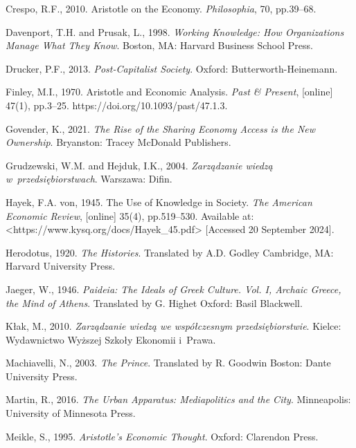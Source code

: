 Crespo, R.F., 2010. Aristotle on the Economy. \textit{Philosophia}, 70, pp.39–68.



Davenport, T.H. and Prusak, L., 1998. \textit{Working Knowledge: How Organizations Manage What They Know}. Boston, MA: Harvard Business School Press.



Drucker, P.F., 2013. \textit{Post-Capitalist Society}. Oxford: Butterworth-Heinemann.



Finley, M.I., 1970. Aristotle and Economic Analysis. \textit{Past \& Present}, [online] 47(1), pp.3–25. https://doi.org/10.1093/past/47.1.3.



Govender, K., 2021. \textit{The Rise of the Sharing Economy Access is the New Ownership}. Bryanston: Tracey McDonald Publishers.



Grudzewski, W.M. and Hejduk, I.K., 2004. \textit{Zarządzanie wiedzą w~przedsiębiorstwach}. Warszawa: Difin.



Hayek, F.A. von, 1945. The Use of Knowledge in Society. \textit{The American Economic Review}, [online] 35(4), pp.519–530. Available at: {\textless}https://www.kysq.org/docs/Hayek\_45.pdf{\textgreater} [Accessed 20 September 2024].



Herodotus, 1920. \textit{The Histories}. Translated by A.D. Godley Cambridge, MA: Harvard University Press.



Jaeger, W., 1946. \textit{Paideia: The Ideals of Greek Culture. Vol. I, Archaic Greece, the Mind of Athens}. Translated by G. Highet Oxford: Basil Blackwell.



Kłak, M., 2010. \textit{Zarządzanie wiedzą we współczesnym przedsiębiorstwie}. Kielce: Wydawnictwo Wyższej Szkoły Ekonomii i~Prawa.



Machiavelli, N., 2003. \textit{The Prince}. Translated by R. Goodwin Boston: Dante University Press.



Martin, R., 2016. \textit{The Urban Apparatus: Mediapolitics and the City}. Minneapolis: University of Minnesota Press.



Meikle, S., 1995. \textit{Aristotle's Economic Thought}. Oxford: Clarendon Press.



